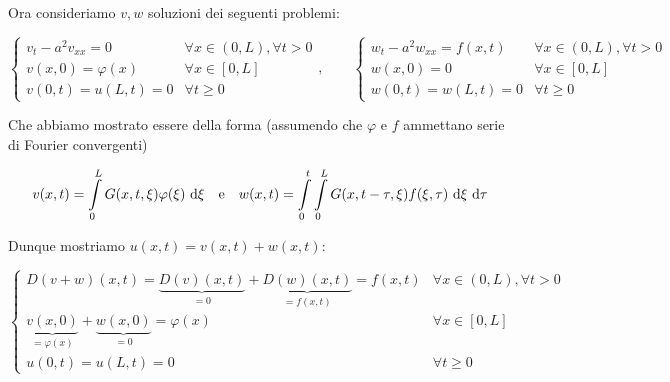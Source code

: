 \documentclass{article}
\begin{document}
Ora consideriamo $v,w$ soluzioni dei seguenti problemi:

\[ \begin{cases} v_t - a^2 v_{xx} = 0 & \forall x \in (0,L), \forall t > 0 \\ v(x,0) = \varphi(x) & \forall x \in [0,L] \\ v(0,t) = u(L,t) = 0 & \forall t \ge 0 \end{cases}, \qquad \begin{cases} w_t - a^2 w_{xx} = f(x,t) & \forall x \in (0,L), \forall t > 0 \\ w(x,0) = 0 & \forall x \in [0,L] \\ w(0,t) = w(L,t) = 0 & \forall t \ge 0 \end{cases}\]

Che abbiamo mostrato essere della forma (assumendo che $\varphi$ e $f$ ammettano serie di Fourier convergenti)

\[v(x,t) = \intop_0^L G(x, t, \xi)\varphi(\xi)\de\xi\quad\text{e} \quad w(x,t) = \intop_0^t\intop_0^L G(x,t-\tau,\xi) f(\xi,\tau)\de\xi\de\tau  \]  

Dunque mostriamo $u(x,t) = v(x,t)+w(x,t)$:

\[ \begin{cases} D(v+w)(x,t) = \underbrace{D(v)(x,t)}_{=0} + \underbrace{D(w)(x,t)}_{=f(x,t)} = f(x,t) & \forall x \in (0,L), \forall t > 0 \\ \underbrace{v(x,0)}_{= \varphi(x)} + \underbrace{w(x,0)}_{=0}  = \varphi(x) & \forall x \in [0,L] \\ u(0,t) = u(L,t) = 0 & \forall t \ge 0 \end{cases}\]
\end{document}
